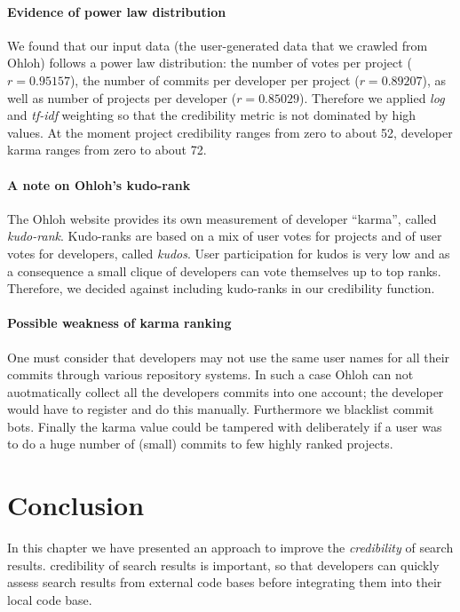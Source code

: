 \paragraph{Evidence of power law distribution} 
We found that our input data (\ie the user-generated data that we crawled from Ohloh) follows a power law distribution: the number of votes per project ($r = 0.95157$), the number of commits per developer per project ($r = 0.89207$), as well as number of projects per developer ($r = 0.85029$). Therefore we applied \emph{log} and \emph{tf-idf} weighting so that the credibility metric is not dominated by high values.
At the moment project credibility ranges from zero to about 52, developer karma ranges from zero to about 72.

\paragraph{A note on Ohloh's kudo-rank}
The Ohloh website provides its own measurement of developer ``karma'', called \emph{kudo-rank}. Kudo-ranks are based on a mix of user votes for projects and of user votes for developers, called \emph{kudos}. User participation for kudos is very low and as a consequence a small clique of developers can vote themselves up to top ranks. Therefore, we decided against including kudo-ranks in our credibility function.

\paragraph{Possible weakness of karma ranking}
One must consider that developers may not use the same user names for all their commits through various repository systems. In such a case Ohloh can not auotmatically collect all the developers commits into one account; the developer would have to register and do this manually. Furthermore we blacklist commit bots. Finally the karma value could be tampered with deliberately if a user was to do a huge number of (small) commits to few highly ranked projects.

\section{Conclusion}
\label{sec:conclusion}

In this chapter we have presented an approach to improve the \emph{credibility} of search results. credibility of search results is important, so that developers can quickly assess search results from external code bases before integrating them into their local code base. 

